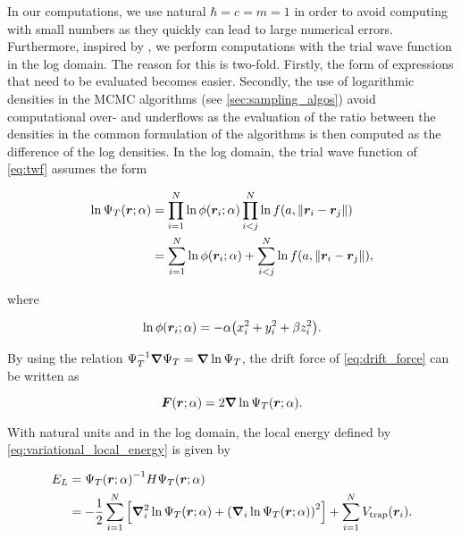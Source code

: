 In our computations, we use natural $\hbar = c =  m = 1$ in order to avoid computing with small numbers as they quickly can lead to large numerical errors. Furthermore, inspired by \cite{FermiNet}, we perform computations with the trial wave function in the log domain. The reason for this is two-fold. Firstly, the form of expressions that need to be evaluated becomes easier. Secondly, the use of logarithmic densities in the MCMC algorithms (see \autoref{sec:sampling_algos}) avoid computational over- and underflows as the evaluation of the ratio between the densities in the common formulation of the algorithms is then computed as the difference of the log densities. In the log domain, the trial wave function of \autoref{eq:twf} assumes the form

\begin{equation}\label{eq:logwf}
\begin{aligned}
  \ln \Psi_T \qty(\bm{r}; \alpha) &= \prod_{i=1}^N \ln \phi \qty(\bm{r}_i; \alpha)  \prod_{i<j}^N \ln f \qty(a, \norm{\bm{r}_i - \bm{r}_j}) \\ 
  &= \sum_{i=1}^N \ln \phi \qty(\bm{r}_i; \alpha)  + \sum_{i<j}^N \ln f \qty(a, \norm{\bm{r}_i - \bm{r}_j}),
\end{aligned}
\end{equation} 

where 

\begin{equation*}
    \ln \phi \qty(\bm{r}_i; \alpha) = -\alpha \qty(x_i^2 + y_i^2 + \beta z_i^2).
\end{equation*}

By using the relation $\Psi_T^{-1} \grad \Psi_T = \grad \ln \Psi_T$, the drift force of \autoref{eq:drift_force} can be written as 

\begin{equation}\label{eq:log_drift_force}
    \bm{F} \qty(\bm{r}; \alpha) = 2 \grad \ln \Psi_T \qty(\bm{r}; \alpha).
\end{equation}

With natural units and in the log domain, the local energy defined by \autoref{eq:variational_local_energy} is given by

\begin{equation}
\begin{aligned}
    E_L &= \Psi_T \qty(\bm{r}; \alpha)^{-1} H \Psi_T \qty(\bm{r}; \alpha) \\
    &= - \frac{1}{2} \sum_{i=1}^N \qty[\grad_i^2 \ln \Psi_T \qty(\bm{r}; \alpha) + \qty(\grad_i \ln \Psi_T \qty(\bm{r}; \alpha))^2] + \sum_{i=1}^{N} V_\mathrm{trap}\qty(\bm{r}_i).
\end{aligned}
\end{equation}


